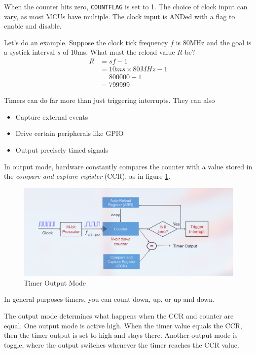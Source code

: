 When the counter hits zero, \texttt{COUNTFLAG} is set to 1.
The choice of clock input can vary, as most MCUs have multiple.
The clock input is ANDed with a flag to enable and disable.

Let's do an example. Suppose the clock tick frequency $f$ is
80MHz and the goal is a systick
interval $s$ of 10ms. What must the reload value $R$ be?
\begin{align}
    R & = sf - 1                \\
      & = 10ms \times 80MHz - 1 \\
      & = 800000 - 1            \\
      & = 799999
\end{align}

Timers can do far more than just triggering interrupts.
They can also
\begin{itemize}
    \item Capture external events
    \item Drive certain peripherals like GPIO
    \item Output precisely timed signals
\end{itemize}
In output mode, hardware constantly compares the
counter with a value stored in the \emph{compare and capture register}
(CCR), as in figure
\ref{fig:outputmodetimer}.

\begin{figure}
    \includegraphics{images/outputmodetimer.png}
    \caption{Timer Output Mode}
    \label{fig:outputmodetimer}
\end{figure}

In general purposes timers, you can count down, up, or up and
down.

The output mode determines what happens when the CCR and counter
are equal. One output mode is active high. When the
timer value equals the CCR, then the timer output is set to high
and stays there. Another output mode is toggle, where the
output switches whenever the timer reaches the CCR value.

